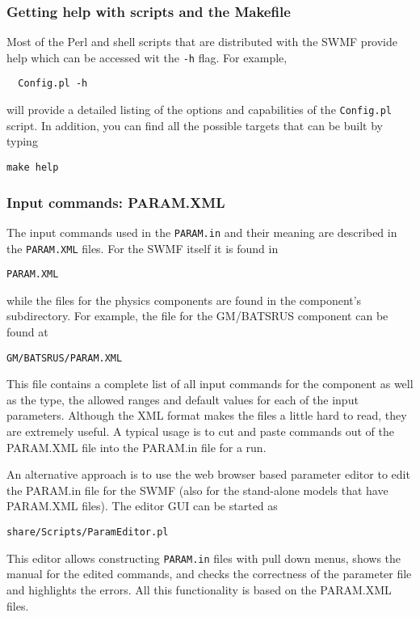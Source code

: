 \subsubsection{Getting help with scripts and the Makefile}

Most of the Perl and shell scripts that are distributed with the SWMF
provide help which can be accessed wit the {\tt -h} flag. For example, 
\begin{verbatim}
  Config.pl -h
\end{verbatim}
will provide a detailed listing of the options and capabilities of the
{\tt Config.pl} script.  In addition, you can find all the possible
targets  that can be built by typing
\begin{verbatim}
make help
\end{verbatim}

\subsubsection{Input commands: PARAM.XML}

The input commands used in the {\tt PARAM.in} and their meaning are 
described in the {\tt PARAM.XML} files. For the SWMF itself it is found in
\begin{verbatim}
PARAM.XML
\end{verbatim}
while the files for the physics components are found in the component's
subdirectory.  For example, the file for the GM/BATSRUS component can
be found at
\begin{verbatim}
GM/BATSRUS/PARAM.XML
\end{verbatim}
This file contains a complete list of all input commands for the
component as well as the type, the allowed ranges and default values
for each of the input parameters.
Although the XML format makes the files a little hard to read, they are
extremely useful.  A typical usage is to cut and paste commands out of the
PARAM.XML file into the PARAM.in file for a run. 

An alternative approach is to use the web browser based parameter editor 
to edit the PARAM.in file for the SWMF 
(also for the stand-alone models that have PARAM.XML files).
The editor GUI can be started as
\begin{verbatim}
share/Scripts/ParamEditor.pl
\end{verbatim}
This editor allows constructing {\tt PARAM.in} files with pull down menus, 
shows the manual for the edited commands, and checks the correctness of
the parameter file and highlights the errors. All this functionality 
is based on the PARAM.XML files.

